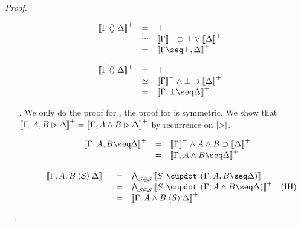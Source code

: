 \begin{proof}
\begin{itemize}
    \item[\rsf{\top{+}}]
    $$
    \begin{array}{rcll}
      \psint{\Gamma \piq{} \Delta}
      &=& \top & \\
      &\semequiv& \nsint{\Gamma} \limp \top \lor \psint{\Delta} & \\
      &=& \psint{\Gamma \seq \top, \Delta}
    \end{array}
    $$

    \item[\rsf{\bot{-}}]
    $$
    \begin{array}{rcll}
      \psint{\Gamma \piq{} \Delta}
      &=& \top & \\
      &\semequiv& \nsint{\Gamma} \land \bot \limp \psint{\Delta} & \\
      &=& \psint{\Gamma, \bot \seq \Delta}
    \end{array}
    $$

    \item[\rsf{\land{-}}, \rsf{\lor{+}}]
    We only do the proof for \rsf{\land{-}}, the proof for \rsf{\lor{+}} is
    symmetric. We show that $\left\llbracket \Gamma, A, B \mathbin{\rhd} \Delta \right\rrbracket^+ = \left\llbracket \Gamma, A
    \land B \mathbin{\rhd} \Delta \right\rrbracket^+$ by recurrence on $\left|\mathbin{\rhd}\right|$.
    \begin{itemize}
      \item[\bcase]
      $$
      \begin{array}{rcll}
        \psint{\Gamma, A, B \seq \Delta}
        &=& \nsint{\Gamma} \land A \land B \limp \psint{\Delta} & \\
        &=& \psint{\Gamma, A \land B \seq \Delta}
      \end{array}
      $$
      \item[\rcase]
      $$
      \begin{array}{rcll}
        \psint{\Gamma, A, B \piq{\cS} \Delta}
        &=& \psintAndMix{S}{\cS}{\Gamma, A, B}{\Delta} & \\
        &=& \psintAndMix{S}{\cS}{\Gamma, A \land B}{\Delta} &\text{(IH)} \\
        &=& \psint{\Gamma, A \land B \piq{\cS} \Delta} & \\
      \end{array}
      $$
    \end{itemize}


\end{itemize}
\end{proof}
